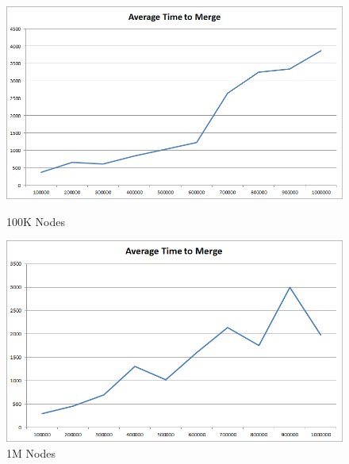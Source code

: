 \begin{figure}[ht]
\begin{minipage}[b]{0.45\linewidth}
\centering
\includegraphics[width=\textwidth]{media/chapter5/perf/mergebignodetest_100K.png}
\caption{100K Nodes}
\label{fig:pic2}
\end{minipage}
\hspace{0.5cm}
\begin{minipage}[b]{0.45\linewidth}
\centering
\includegraphics[width=\textwidth]{media/chapter5/perf/mergebignodetest_1M.png}
\caption{1M Nodes}
\label{fig:pic3}
\end{minipage}
\end{figure}


